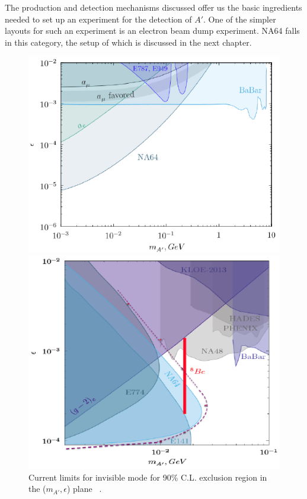 The production and detection mechanisms discussed offer us the basic ingredients needed to set up an experiment for the detection of $A'$. One of the simpler layouts for such an experiment is an electron beam dump experiment. NA64 falls in this category, the setup of which is discussed in the next chapter.
\begin{figure}[t!]
\centering
  \begin{minipage}[t]{.45\textwidth}
    \centering
    \includegraphics[width=\textwidth]{thesis_figures/exclusion_invisible.png}
    \caption{Current limits for invisible mode for 90\% C.L. exclusion region in the ($m_{A'},\epsilon$) plane ~\cite{}.}
    \label{fig:exclusion_invisible}
  \end{minipage}
  \hfill
  \begin{minipage}[t]{.45\textwidth}
    \centering
    \includegraphics[width=\linewidth]{thesis_figures/exclusion_visible_latest.png}

\end{minipage}
\end{figure}

